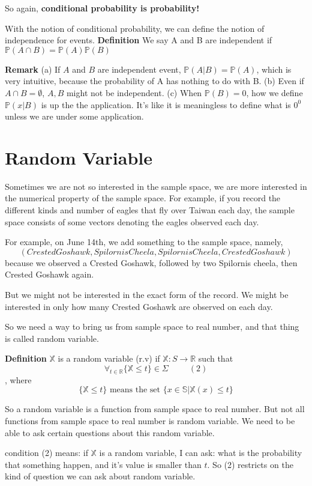 \documentclass[a4paper,12pt]{article}
\begin{document}
So again, \textbf{conditional probability is probability!} 

With the notion of conditional probability, we can define the notion of independence for events.
\textbf{Definition} We say A and B are independent if $\mathbb{P}(A \cap B) = \mathbb{P}(A) \mathbb{P}(B)$

\textbf{Remark} 
(a) If $A$ and $B$ are independent event, $\mathbb{P}(A|B) = \mathbb{P}(A)$, which is very intuitive, because the probability of A has nothing to do with B. 
(b) Even if $A \cap B = \emptyset$, $A, B$ might not be independent. 
(c) When $\mathbb{P}(B) = 0$, how we define $\mathbb{P}(x|B)$ is up the the application. It's like it is meaningless to define what is $0^0$ unless we are under some application. 

\newpage
\section{Random Variable}
Sometimes we are not so interested in the sample space, we are more interested in the numerical property of the sample space. For example, if you record the different kinds and number of eagles that fly over Taiwan each day, the sample space consists of some vectors denoting the eagles observed each day.

For example, on June 14th, we add something to the sample space, namely, $$( Crested Goshawk, Spilornis Cheela, Spilornis Cheela, Crested Goshawk )$$
because we observed a Crested Goshawk, followed by two Spilornis cheela, then Crested Goshawk again.

But we might not be interested in the exact form of the record. We might be interested in only how many Crested Goshawk are observed on each day. 

So we need a way to bring us from sample space to real number, and that thing is called random variable. 

\textbf{Definition} 
$\mathbb{X}$ is a random variable (r.v) if
$\mathbb{X}: S \to \mathbb{R}$
such that
$$\forall_{t\in\mathbb{R}}\{\mathbb{X}\leq t\}\in \Sigma\ \ \ \ \ \ \ \ \ \ \ (2)$$
, where
$$\{\mathbb{X} \leq t\} \text{ means the set } \{x \in \mathbb{S} | \mathbb{X}(x) \leq t\}$$

So a random variable is a function from sample space to real number. But not all functions from sample space to real number is random variable. We need to be able to ask certain questions about this random variable. 

condition (2) means: if $\mathbb{X}$ is a random variable, I can ask: what is the probability that something happen, and it's value is smaller than $t$. So (2) restricts on the kind of question we can ask about random variable.
\end{document}
